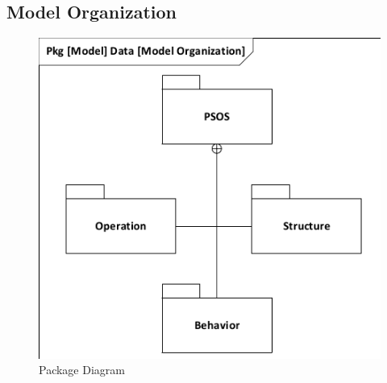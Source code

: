 \subsection{Model Organization}


\begin{figure}[!h]
	\centering
	\includegraphics[width=0.7\linewidth]{diagram/pkg_data_model_organization.pdf}
	\caption{Package Diagram}
	\label{fig:pkg}
\end{figure}
